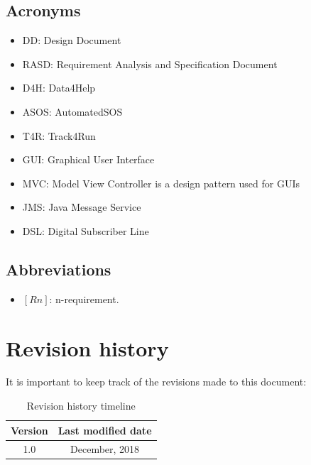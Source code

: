 \documentclass[a4paper, hidelinks, 12pt]{report}
\begin{document}
	\subsection{Acronyms}
	\begin{itemize}
		\item{DD}: Design Document
		\item{RASD}: Requirement Analysis and Specification Document
		\item{D4H}: Data4Help
		\item{ASOS}: AutomatedSOS
		\item{T4R}: Track4Run
		\item{GUI}: Graphical User Interface
		\item{MVC}: Model View Controller is a design pattern used for GUIs
		\item{JMS}: Java Message Service 
		\item{DSL}: Digital Subscriber Line
	\end{itemize}
	
	\subsection{Abbreviations}
	\begin{itemize}
		\item $[Rn]$: n-requirement.
	\end{itemize}
	
	\section{Revision history}
	It is important to keep track of the revisions made to this document: \\
	
	\begin{table}[h]
		\centering
		\begin{tabular}{c c}
			\hline\hline
			\textbf{Version} & \textbf{Last modified date} \\ [0.5ex]
			\hline
			1.0 &  \nth{10} December, 2018  \\
			\hline
		\end{tabular}
		\caption{Revision history timeline}
		\label{fig:Revision history}
	\end{table}
	
\end{document}
